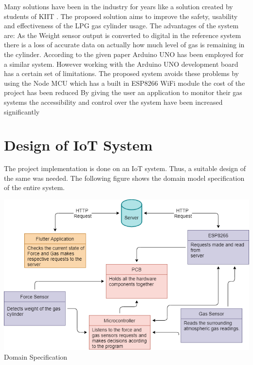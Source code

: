 \documentclass[conference]{IEEEtran}
\newenvironment{Figure}
  {\par\medskip\noindent\minipage{\linewidth}}
  {\endminipage\par\medskip}
\begin{document}
Many solutions have been in the industry for years like
a solution created by students of KIIT \cite{[7]}.
The proposed solution aims to improve the safety,
usability and effectiveness of the LPG gas cylinder
usage. The advantages of the system are:
As the Weight sensor output is converted to digital
in the reference system there is a loss of accurate
data on actually how much level of gas is remaining
in the cylinder. According to the given paper \cite{[5]}
Arduino UNO has been employed for a similar system.
However working with the Arduino UNO development board has
a certain set of limitations. The proposed system avoids these
problems by using the Node MCU which has a built in
ESP8266 WiFi module the cost of the project has been
reduced By giving the user an application to monitor
their gas systems the accessibility and control over
the system have been increased significantly

\pagebreak

\section{Design of IoT System}
The project implementation is done on an IoT system. Thus, a
suitable design of the same was needed. The following figure
shows the domain model specification of the entire system.
\begin{Figure}
  \centering
  \includegraphics[width=\linewidth]{./Images/DomainModelPPT.drawio.png}
  \figurename{Domain Specification}
\end{Figure}
\end{document}
